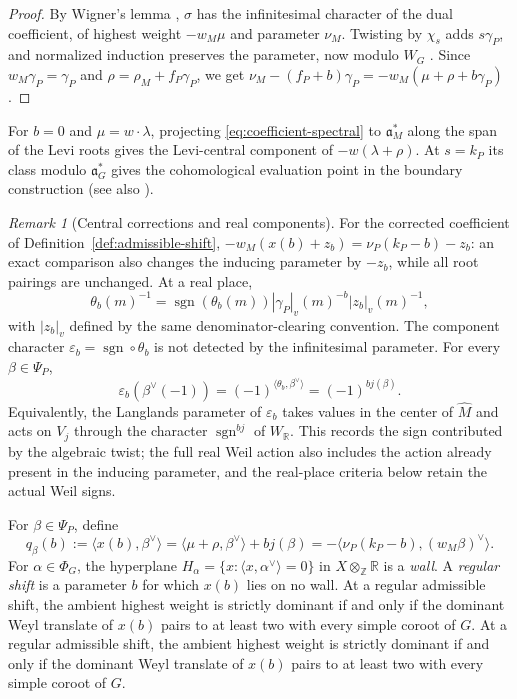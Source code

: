\documentclass[12pt]{amsart}
\numberwithin{equation}{section}
\theoremstyle{plain}
\theoremstyle{definition}
\theoremstyle{remark}
\newtheorem{remark}[theorem]{Remark}
\begin{document}
\begin{proof}
By Wigner's lemma \cite[Ch.~I, Theorem~5.3(ii)]{BorelWallach}, $\sigma$ has the infinitesimal character of the dual coefficient, of highest weight $-w_M\mu$ and parameter $\nu_M$. Twisting by $\chi_s$ adds $s\gamma_P$, and normalized induction preserves the parameter, now modulo $W_G$ \cite[Lemma~3.2(2)]{Vogan2000}. Since $w_M\gamma_P=\gamma_P$ and $\rho=\rho_M+f_P\gamma_P$, we get $\nu_M-(f_P+b)\gamma_P=-w_M(\mu+\rho+b\gamma_P)$. 
\end{proof}

For $b=0$ and $\mu=w\cdot\lambda$, projecting \eqref{eq:coefficient-spectral} to $\mathfrak a_M^*$ along the span of the Levi roots gives the Levi-central component of $-w(\lambda+\rho)$. At $s=k_P$ its class modulo $\mathfrak a_G^*$ gives the cohomological evaluation point in the boundary construction \cite{Schwermer1983}
(see also \cite[(4.1)]{Clozel2022}).

\begin{remark}[Central corrections and real components] \label{rem:central-correction-parameter}
For the corrected coefficient of Definition~\ref{def:admissible-shift}, $-w_M(x(b)+z_b)=\nu_P(k_P-b)-z_b$: an exact comparison also changes the inducing parameter by $-z_b$, while all root pairings are unchanged. At a real place,
\[
 \theta_b(m)^{-1}
  =\operatorname{sgn}(\theta_b(m))
      |\gamma_P|_v(m)^{-b}|z_b|_v(m)^{-1},
\]
with $|z_b|_v$ defined by the same denominator-clearing convention. The component character $\varepsilon_b=\operatorname{sgn}\circ\theta_b$ is not detected by the infinitesimal parameter. For every $\beta\in\Psi_P$, 
\[
 \varepsilon_b(\beta^\vee(-1))
   =(-1)^{\langle\theta_b,\beta^\vee\rangle}
   =(-1)^{b j(\beta)}.
\]
Equivalently, the Langlands parameter of $\varepsilon_b$ takes values in the center of $\widehat M$ and acts on $V_j$ through the character $\operatorname{sgn}^{bj}$ of $W_{\mathbb R}$. This records the sign contributed by the algebraic twist; the full real Weil action also includes the action already present in the inducing parameter, and the real-place criteria below retain the actual Weil signs.
\end{remark}

For $\beta\in\Psi_P$, define
\begin{equation}\label{eq:q-H}
 q_\beta(b):=\langle x(b),\beta^\vee\rangle
       =\langle\mu+\rho,\beta^\vee\rangle+bj(\beta)
       =-\langle\nu_P(k_P-b),(w_M\beta)^\vee\rangle.
\end{equation}
For $\alpha\in\Phi_G$, the hyperplane $H_\alpha=\{x:\langle x,\alpha^\vee\rangle=0\}$ in
$X\otimes_{\mathbb Z}\mathbb R$ is a \emph{wall}. A \emph{regular shift} is a parameter $b$ for which $x(b)$ lies on no wall. At a regular admissible shift, the ambient highest weight is strictly dominant if and only if the dominant Weyl translate of $x(b)$ pairs to at least two with every simple coroot of $G$. At a regular admissible shift, the ambient highest weight is strictly dominant if and only if the dominant Weyl translate of $x(b)$ pairs to at least two with every simple coroot of $G$.
\end{document}
